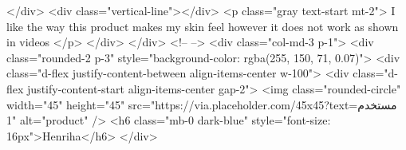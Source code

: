             </div>
            <div class="vertical-line"></div>
            <p class="gray text-start mt-2">
              I like the way this product makes my skin feel however it does not
              work as shown in videos
            </p>
          </div>
        </div>
        <!--  -->
        <div class="col-md-3 p-1">
          <div class="rounded-2 p-3" style="background-color: rgba(255, 150, 71, 0.07)">
            <div class="d-flex justify-content-between align-items-center w-100">
              <div class="d-flex justify-content-start align-items-center gap-2">
                <img class="rounded-circle" width="45" height="45"
                  src="https://via.placeholder.com/45x45?text=مستخدم 1" alt="product" />
                <h6 class="mb-0 dark-blue" style="font-size: 16px">Henriha</h6>
              </div>

